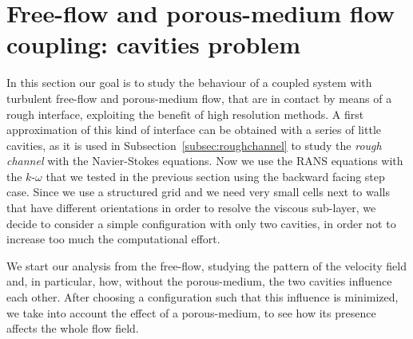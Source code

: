 \FloatBarrier
\section{Free-flow and porous-medium flow coupling: cavities problem}
In this section our goal is to study the behaviour of a coupled system with turbulent free-flow and 
porous-medium flow, that are in contact by means of a rough interface, exploiting the benefit of high resolution methods. A first approximation of this kind of interface can be obtained with a series of little
cavities, as it is used in Subsection~\ref{subsec:roughchannel} to study the \emph{rough channel} with the 
Navier-Stokes equations. Now we use the RANS equations with the 
$k\text{-}\omega$ that we tested in the previous section using the backward 
facing step case.
Since we use a structured grid and we need very small cells next to walls that 
have different orientations in order to resolve the viscous sub-layer, we 
decide to consider a simple configuration with only two cavities, in order not 
to increase too much the computational effort.

We start our analysis from the free-flow, studying the pattern of the velocity 
field and, in particular, how, without the porous-medium, the two cavities 
influence each other.
After choosing a configuration such that this influence is minimized, we take 
into account the effect of a porous-medium, to see how its presence affects the 
whole flow field.
%

